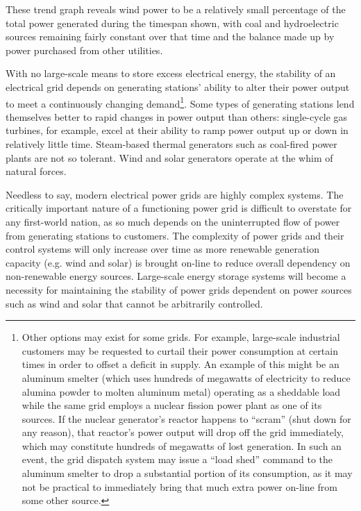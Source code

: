 These trend graph reveals wind power to be a relatively small percentage of the total power generated during the timespan shown, with coal and hydroelectric sources remaining fairly constant over that time and the balance made up by power purchased from other utilities.

With no large-scale means to store excess electrical energy, the stability of an electrical grid depends on generating stations' ability to alter their power output to meet a continuously changing demand\footnote{Other options may exist for some grids.  For example, large-scale industrial customers may be requested to curtail their power consumption at certain times in order to offset a deficit in supply.  An example of this might be an aluminum smelter (which uses hundreds of megawatts of electricity to reduce alumina powder to molten aluminum metal) operating as a sheddable load while the same grid employs a nuclear fission power plant as one of its sources.  If the nuclear generator's reactor happens to ``scram'' (shut down for any reason), that reactor's power output will drop off the grid immediately, which may constitute hundreds of megawatts of lost generation.  In such an event, the grid dispatch system may issue a ``load shed'' command to the aluminum smelter to drop a substantial portion of its consumption, as it may not be practical to immediately bring that much extra power on-line from some other source.}.  Some types of generating stations lend themselves better to rapid changes in power output than others: single-cycle gas turbines, for example, excel at their ability to ramp power output up or down in relatively little time.  Steam-based thermal generators such as coal-fired power plants are not so tolerant.  Wind and solar generators operate at the whim of natural forces.

\vskip 10pt

Needless to say, modern electrical power grids are highly complex systems.  The critically important nature of a functioning power grid is difficult to overstate for any first-world nation, as so much depends on the uninterrupted flow of power from generating stations to customers.  The complexity of power grids and their control systems will only increase over time as more renewable generation capacity (e.g. wind and solar) is brought on-line to reduce overall dependency on non-renewable energy sources.  Large-scale energy storage systems will become a necessity for maintaining the stability of power grids dependent on power sources such as wind and solar that cannot be arbitrarily controlled.









